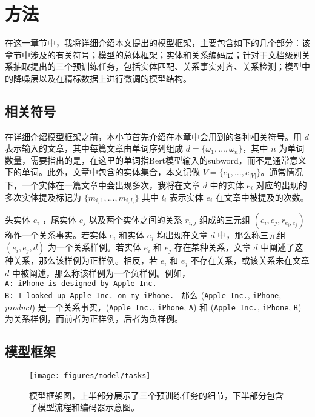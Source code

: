 
\chapter{方法}
\label{cha:model}
在这一章节中，我将详细介绍本文提出的模型框架，主要包含如下的几个部分：该章节中涉及的有关符号；模型的总体框架；实体和关系编码层；针对于文档级别关系抽取提出的三个预训练任务，包括实体匹配、关系事实对齐、关系检测；模型中的降噪层以及在精标数据上进行微调的模型结构。



\section{相关符号}
在详细介绍模型框架之前，本小节首先介绍在本章中会用到的各种相关符号。用 $d$ 表示输入的文章，其中每篇文章由单词序列组成 $d = \{\omega_1, ..., \omega_n\}$，其中 $n$ 为单词数量，需要指出的是，在这里的单词指Bert模型输入的subword，而不是通常意义下的单词。此外，文章中包含的实体集合，本文记做 $V = \{e_1, ..., e_{|V|}\}$。通常情况下，一个实体在一篇文章中会出现多次，我将在文章 $d$ 中的实体 $e_i$ 对应的出现的多次实体提及标记为 $\{m_{i,1}, ..., m_{i, l_i}\}$ 其中 $l_i$ 表示实体 $e_i$ 在文章中被提及的次数。

头实体 $e_i$ ，尾实体 $e_j$ 以及两个实体之间的关系 $r_{i, j}$ 组成的三元组 $(e_i, e_j, r_{e_i, e_j})$ 称作一个关系事实。若实体 $e_i$ 和实体 $e_j$ 均出现在文章 $d$ 中，那么称三元组 $(e_i, e_j, d)$ 为一个关系样例。若实体 $e_i$ 和 $e_j$ 存在某种关系，文章 $d$ 中阐述了这种关系，那么该样例为正样例。相反，若 $e_i$ 和 $e_j$ 不存在关系，或该关系未在文章 $d$ 中被阐述，那么称该样例为一个负样例。例如，\\
\texttt{A: iPhone is designed by Apple Inc.\\
B: I looked up Apple Inc. on my iPhone.
}
那么 (\texttt{Apple Inc.}, \texttt{iPhone}, \textit{product}) 是一个关系事实，(\texttt{Apple Inc.}, \texttt{iPhone}, \texttt{A}) 和 (\texttt{Apple Inc.}, \texttt{iPhone}, \texttt{B}) 为关系样例，而前者为正样例，后者为负样例。


\section{模型框架}

\begin{figure}
	\centering
	\texttt{[image: figures/model/tasks]}
	\caption{模型框架图，上半部分展示了三个预训练任务的细节，下半部分包含了模型流程和编码器示意图。}
	\label{framework}
\end{figure}

